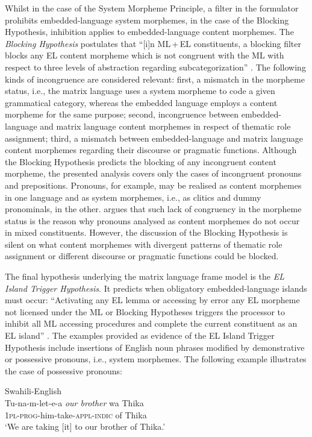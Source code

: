 Whilst in the case of the System Morpheme Principle, a filter in the formulator prohibits embedded-language system morphemes, in the case of the Blocking Hypothesis, inhibition applies to embedded-language content morphemes. The \textit{Blocking Hypothesis} postulates that ``[i]n ML\,+\,EL constituents, a blocking filter blocks any EL content morpheme which is not congruent with the ML with respect to three levels of abstraction regarding subcategorization'' \citep[120]{myers-scotton-duelling-1993}. The following kinds of incongruence are considered relevant: first, a mismatch in the morpheme status, i.e., the matrix language uses a system morpheme to code a given grammatical category, whereas the embedded language employs a content morpheme for the same purpose; second, incongruence between embedded-language and matrix language content morphemes in respect of thematic role assignment; third, a mismatch between embedded-language and matrix language content morphemes regarding their discourse or pragmatic functions. Although the Blocking Hypothesis predicts the blocking of any incongruent content morpheme, the presented analysis covers only the cases of incongruent pronouns and prepositions. Pronouns, for example, may be realised as content morphemes in one language and as system morphemes, i.e., as clitics and dummy pronominals, in the other. \citet[126--128]{myers-scotton-duelling-1993} argues that such lack of congruency in the morpheme status is the reason why pronouns analysed as content morphemes do not occur in mixed constituents. However, the discussion of the Blocking Hypothesis is silent on what content morphemes with divergent patterns of thematic role assignment or different discourse or pragmatic functions could be blocked.

The final hypothesis underlying the matrix language frame model is the \textit{EL Island Trigger Hypothesis}. It predicts when obligatory embedded-language islands must occur:  ``Activating any EL lemma or accessing by error any EL morpheme not licensed under the ML or Blocking Hypotheses triggers the processor to inhibit all ML accessing procedures and complete the current constituent as an EL island'' \citep[139]{myers-scotton-duelling-1993}. The examples provided as evidence of the EL Island Trigger Hypothesis include insertions of English noun phrases modified by demonstrative or possessive pronouns, i.e., system morphemes. The following example illustrates the case of  possessive pronouns: 

\ea{\label{ex:1:10}}
Swahili-English \citep[141]{myers-scotton-duelling-1993}\\
\gll Tu-na-m-let-e-a \textit{our brother} wa Thika\\
	\textsc{1pl-prog}-him-take-\textsc{appl-indic} {}  of Thika\\
\glt `We are taking [it] to our brother of Thika.'
\z

